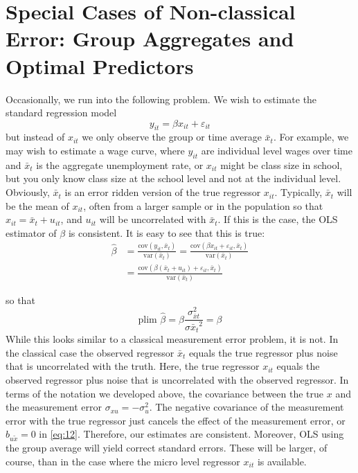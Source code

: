 \documentclass[12pt]{article}
\begin{document}
\section*{Special Cases of Non-classical Error: Group Aggregates and Optimal Predictors}
Occasionally, we run into the following problem. We wish to estimate the standard regression model
\[
y_{it} = \beta x_{it} + \varepsilon_{it}
\]
but instead of $x_{it}$ we only observe the group or time average $\bar{x}_t$. For example, we may wish to estimate a wage curve, where $y_{it}$ are individual level wages over time and $\bar{x}_t$ is the aggregate unemployment rate, or $x_{it}$ might be class size in school, but you only know class size at the school level and not at the individual level. Obviously, $\bar{x}_t$ is an error ridden version of the true regressor $x_{it}$. Typically, $\bar{x}_t$ will be the mean of $x_{it}$, often from a larger sample or in the population so that $x_{it} = \bar{x}_t + u_{it}$, and $u_{it}$ will be uncorrelated with $\bar{x}_t$. If this is the case, the OLS estimator of $\beta$ is consistent. It is easy to see that this is true:
\begin{align*}
\hat{\beta} &= \frac{\text{cov}(y_{it}, \bar{x}_t)}{\text{var}(\bar{x}_t)} = \frac{\text{cov}(\beta x_{it} + \varepsilon_{it}, \bar{x}_t)}{\text{var}(\bar{x}_t)}\\
&= \frac{\text{cov}\left(\beta(\bar{x}_t + u_{it}) + \varepsilon_{it}, \bar{x}_t\right)}{\text{var}(\bar{x}_t)}
\end{align*}

so that
\[
\text{plim } \hat{\beta} = \beta \frac{\sigma_{\bar{x}t}^2}{\sigma{\bar{x}_t}^2} = \beta
\]
While this looks similar to a classical measurement error problem, it is not. In the classical case the observed regressor $\bar{x}_t$ equals the true regressor plus noise that is uncorrelated with the truth. Here, the true regressor $x_{it}$ equals the observed regressor plus noise that is uncorrelated with the observed regressor. In terms of the notation we developed above, the covariance between the true $x$ and the measurement error $\sigma_{xu} = -\sigma_u^2$. The negative covariance of the measurement error with the true regressor just cancels the effect of the measurement error, or $b_{u\tilde{x}} = 0$ in \eqref{eq:12}. Therefore, our estimates are consistent. Moreover, OLS using the group average will yield correct standard errors. These will be larger, of course, than in the case where the micro level regressor $x_{it}$ is available.
\end{document}
